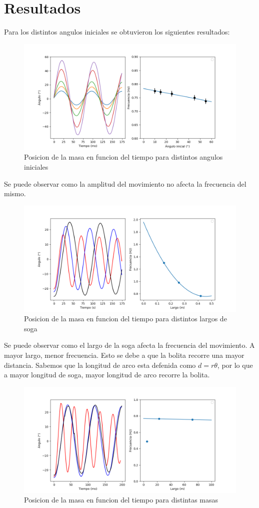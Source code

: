 \documentclass[12pt,a4]{article}
\begin{document}
\section{Resultados}

Para los distintos angulos iniciales se obtuvieron los siguientes resultados:

\begin{figure}[H]
    \centering
    \includegraphics[width=0.6\linewidth]{angulos.png}
    \caption{Posicion de la masa en funcion del tiempo para distintos angulos iniciales}
    \label{fig:angulos}
\end{figure}

Se puede observar como la amplitud del movimiento no afecta la frecuencia del mismo. 

\begin{figure}[H]
    \centering
    \includegraphics[width=0.6\linewidth]{largo.png}
    \caption{Posicion de la masa en funcion del tiempo para distintos largos de soga}
    \label{fig:largo}
\end{figure}

Se puede observar como el largo de la soga afecta la frecuencia del movimiento. A mayor largo, menor frecuencia. Esto se debe a que la bolita recorre una mayor distancia. Sabemos que la longitud de arco esta defenida como $d = r \theta$, por lo que a mayor longitud de soga, mayor longitud de arco recorre la bolita.

\begin{figure}[H]
    \centering
    \includegraphics[width=0.6\linewidth]{peso.png}
    \caption{Posicion de la masa en funcion del tiempo para distintas masas}
    \label{fig:masa}
\end{figure}
\end{document}
